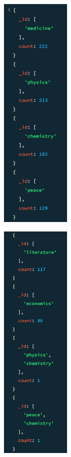 \documentclass{article}
\begin{document}
\begin{multicols*}{2}
    \begin{figure}[H]
        \includegraphics[width=0.3\textwidth]{images/q3a.png}
    \end{figure}

    \columnbreak

    \begin{figure}[H]
        \includegraphics[width=0.3\textwidth]{images/q3b.png}
    \end{figure}
\end{multicols*}
\end{document}
